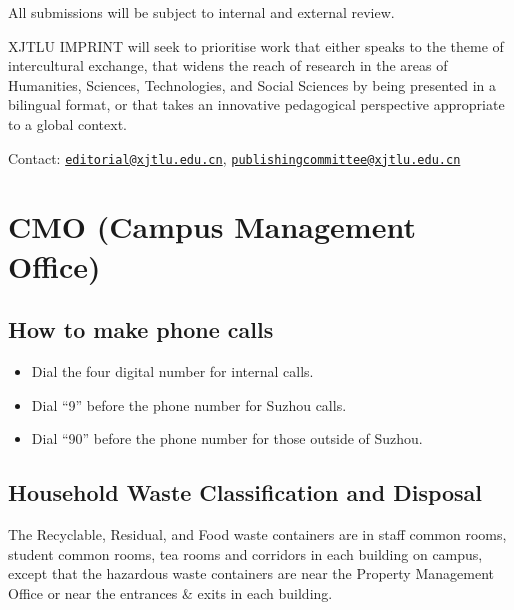 \documentclass[
]{book}
\providecommand{\tightlist}{%
  \setlength{\itemsep}{0pt}\setlength{\parskip}{0pt}}
\begin{document}
All submissions will be subject to internal and external review.

XJTLU IMPRINT will seek to prioritise work that either speaks to the theme of intercultural exchange, that widens the reach of research in the areas of Humanities, Sciences, Technologies, and Social Sciences by being presented in a bilingual format, or that takes an innovative pedagogical perspective appropriate to a global context.

Contact: \href{mailto:editorial@xjtlu.edu.cn}{\nolinkurl{editorial@xjtlu.edu.cn}}, \href{mailto:publishingcommittee@xjtlu.edu.cn}{\nolinkurl{publishingcommittee@xjtlu.edu.cn}}

\hypertarget{cmo-campus-management-office}{%
\chapter{CMO (Campus Management Office)}\label{cmo-campus-management-office}}

\hypertarget{how-to-make-phone-calls}{%
\section{How to make phone calls}\label{how-to-make-phone-calls}}

\begin{itemize}
\tightlist
\item
  Dial the four digital number for internal calls.
\item
  Dial ``9'' before the phone number for Suzhou calls.
\item
  Dial ``90'' before the phone number for those outside of Suzhou.
\end{itemize}

\hypertarget{household-waste-classification-and-disposal}{%
\section{Household Waste Classification and Disposal}\label{household-waste-classification-and-disposal}}

The Recyclable, Residual, and Food waste containers are in staff common rooms, student common rooms, tea rooms and corridors in each building on campus, except that the hazardous waste containers are near the Property Management Office or near the entrances \& exits in each building.
\end{document}
